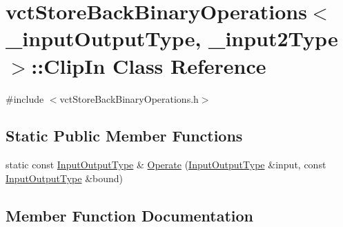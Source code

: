 \hypertarget{classvct_store_back_binary_operations_1_1_clip_in}{}\section{vct\+Store\+Back\+Binary\+Operations$<$ \+\_\+input\+Output\+Type, \+\_\+input2\+Type $>$\+:\+:Clip\+In Class Reference}
\label{classvct_store_back_binary_operations_1_1_clip_in}


{\ttfamily \#include $<$vct\+Store\+Back\+Binary\+Operations.\+h$>$}

\subsection*{Static Public Member Functions}
\begin{DoxyCompactItemize}
\item 
static const \hyperlink{classvct_store_back_binary_operations_a9dc481d9e1345541dd5d833d5e5688f3}{Input\+Output\+Type} \& \hyperlink{classvct_store_back_binary_operations_1_1_clip_in_a3c10d2231d05540785b1b3ed98744124}{Operate} (\hyperlink{classvct_store_back_binary_operations_a9dc481d9e1345541dd5d833d5e5688f3}{Input\+Output\+Type} \&input, const \hyperlink{classvct_store_back_binary_operations_a9dc481d9e1345541dd5d833d5e5688f3}{Input\+Output\+Type} \&bound)
\end{DoxyCompactItemize}


\subsection{Member Function Documentation}
\hypertarget{classvct_store_back_binary_operations_1_1_clip_in_a3c10d2231d05540785b1b3ed98744124}{}
